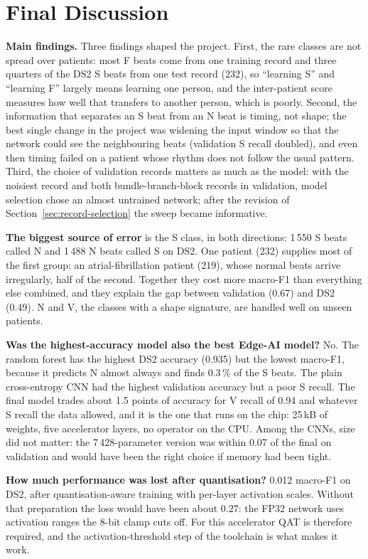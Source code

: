 \section{Final Discussion}
\label{sec:discussion}

\textbf{Main findings.} Three findings shaped the project. First, the rare classes are not spread over patients: most F beats come from one training record and three quarters of the DS2 S beats from one test record (232), so ``learning S'' and ``learning F'' largely means learning one person, and the inter-patient score measures how well that transfers to another person, which is poorly. Second, the information that separates an S beat from an N beat is timing, not shape; the best single change in the project was widening the input window so that the network could see the neighbouring beats (validation S recall doubled), and even then timing failed on a patient whose rhythm does not follow the usual pattern. Third, the choice of validation records matters as much as the model: with the noisiest record and both bundle-branch-block records in validation, model selection chose an almost untrained network; after the revision of Section~\ref{sec:record-selection} the sweep became informative.

\textbf{The biggest source of error} is the S class, in both directions: 1\,550 S beats called N and 1\,488 N beats called S on DS2. One patient (232) supplies most of the first group; an atrial-fibrillation patient (219), whose normal beats arrive irregularly, half of the second. Together they cost more macro-F1 than everything else combined, and they explain the gap between validation (0.67) and DS2 (0.49). N and V, the classes with a shape signature, are handled well on unseen patients.

\textbf{Was the highest-accuracy model also the best Edge-AI model?} No. The random forest has the highest DS2 accuracy (0.935) but the lowest macro-F1, because it predicts N almost always and finds 0.3\,\% of the S beats. The plain cross-entropy CNN had the highest validation accuracy but a poor S recall. The final model trades about 1.5 points of accuracy for V recall of 0.94 and whatever S recall the data allowed, and it is the one that runs on the chip: 25\,kB of weights, five accelerator layers, no operator on the CPU. Among the CNNs, size did not matter: the 7\,428-parameter version was within 0.07 of the final on validation and would have been the right choice if memory had been tight.

\textbf{How much performance was lost after quantisation?} 0.012 macro-F1 on DS2, after quantisation-aware training with per-layer activation scales. Without that preparation the loss would have been about 0.27: the FP32 network uses activation ranges the 8-bit clamp cuts off. For this accelerator QAT is therefore required, and the activation-threshold step of the toolchain is what makes it work.

